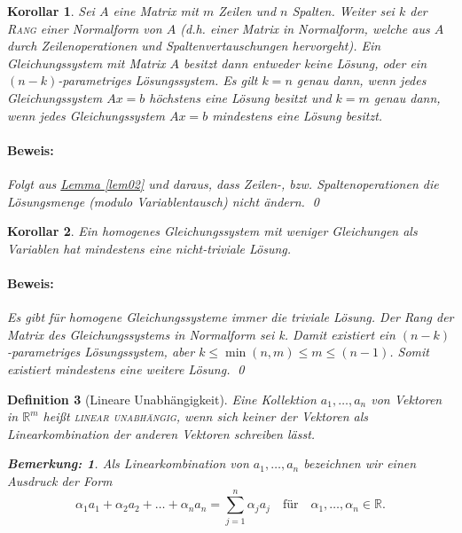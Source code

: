 \documentclass{report}
\newcommand{\IN}[1]{\index{#1|BH}}
\newcommand{\R}{\mathbb{R}}
\newcommand{\al}{\alpha}
\theoremstyle{customrem}
\newtheorem*{bemerkung}{Bemerkung\textnormal:}
\theoremstyle{customdef}
\newtheorem{definition}{Definition}[chapter]
\newtheorem{korrolar}[definition]{Korollar}
\renewenvironment{proof}{\paragraph{Beweis: }}{\qed}
\theoremstyle{customenv}
\newcommand{\defemph}[1]{\textsc{#1}}
\begin{document}
	\begin{korrolar}
		Sei \(A\) eine Matrix mit \(m\) Zeilen und \(n\) Spalten. Weiter sei \(k\) der \defemph{Rang} einer Normalform von \(A\) (d.h. einer Matrix in Normalform, welche aus \(A\) durch Zeilenoperationen und Spaltenvertauschungen hervorgeht). Ein Gleichungssystem  mit Matrix \(A\) besitzt dann entweder keine Lösung, oder ein \((n-k)\)-parametriges Lösungssystem. Es gilt \(k=n\) genau dann, wenn jedes Gleichungssystem \(Ax=b\) \textit{höchstens} eine Lösung besitzt und \(k=m\) genau dann, wenn jedes Gleichungssystem \(Ax=b\) \textit{mindestens} eine Lösung besitzt.\\
		\begin{proof}
			Folgt aus \hyperref[lem02]{Lemma \ref*{lem02}} und daraus, dass Zeilen-, bzw. Spaltenoperationen die Lösungsmenge (modulo Variablentausch) nicht ändern.
		\end{proof}
	\end{korrolar}
	\vspace{.2cm}
	\begin{korrolar}
		\label{kor5}
		Ein homogenes Gleichungssystem mit weniger Gleichungen als Variablen hat mindestens eine nicht-triviale Lösung.
		\begin{proof}
			Es gibt für homogene Gleichungssysteme immer die triviale Lösung. Der Rang der Matrix des Gleichungssystems in Normalform sei k. Damit existiert ein \((n-k)\)-parametriges Lösungssystem, aber \(k \le \min(n, m) \le m \le (n-1)\). Somit existiert mindestens eine weitere Lösung.
		\end{proof}
	\end{korrolar}
	
	\begin{definition}[Lineare Unabhängigkeit]
		\IN{Lineare Unabhängigkeit}
		\label{deflineareunab}
		Eine Kollektion \(a_1, \dots, a_n\) von Vektoren in \(\R^m\) heißt \defemph{linear unabhängig}, wenn sich keiner der Vektoren als Linearkombination der anderen Vektoren schreiben lässt.\\
		
		\begin{bemerkung}
			Als Linearkombination von \(a_1, \dots, a_n\) bezeichnen  wir einen Ausdruck der Form \[\al_1a_1 + \al_2 a_2 + \ldots + \al_n a_n = \sum_{j=1}^n \al_j a_j\quad\text{für}\quad\al_1, \dots, \al_n \in \R.\]
		\end{bemerkung}
	\end{definition}
		
\end{document}
